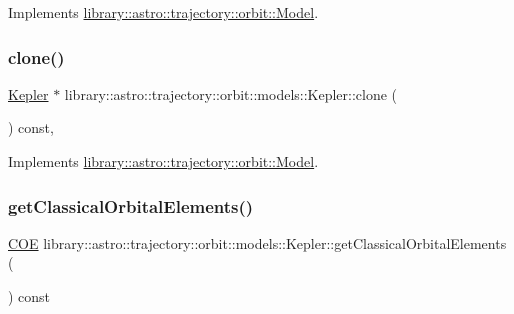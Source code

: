 Implements \hyperlink{classlibrary_1_1astro_1_1trajectory_1_1orbit_1_1_model_a34198a504836b9779425da99d964d19c}{library\+::astro\+::trajectory\+::orbit\+::\+Model}.

\mbox{\label{classlibrary_1_1astro_1_1trajectory_1_1orbit_1_1models_1_1_kepler_ac78a023cde4a61c62309051c9147d66e}} 
\subsubsection{\texorpdfstring{clone()}{clone()}}
{\footnotesize\ttfamily \hyperlink{classlibrary_1_1astro_1_1trajectory_1_1orbit_1_1models_1_1_kepler}{Kepler} $\ast$ library\+::astro\+::trajectory\+::orbit\+::models\+::\+Kepler\+::clone (\begin{DoxyParamCaption}{ }\end{DoxyParamCaption}) const\hspace{0.3cm}{\ttfamily [override]}, {\ttfamily [virtual]}}



Implements \hyperlink{classlibrary_1_1astro_1_1trajectory_1_1orbit_1_1_model_a45d75e4d212a9bb01aa596eaeeae43ae}{library\+::astro\+::trajectory\+::orbit\+::\+Model}.

\mbox{\label{classlibrary_1_1astro_1_1trajectory_1_1orbit_1_1models_1_1_kepler_a224a8ad539b7739447a0e9bd98e6f66d}} 
\subsubsection{\texorpdfstring{get\+Classical\+Orbital\+Elements()}{getClassicalOrbitalElements()}}
{\footnotesize\ttfamily \hyperlink{classlibrary_1_1astro_1_1trajectory_1_1orbit_1_1models_1_1kepler_1_1_c_o_e}{C\+OE} library\+::astro\+::trajectory\+::orbit\+::models\+::\+Kepler\+::get\+Classical\+Orbital\+Elements (\begin{DoxyParamCaption}{ }\end{DoxyParamCaption}) const}

